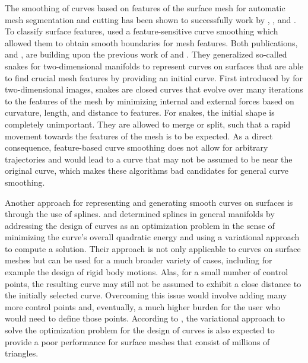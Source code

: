 \documentclass{stdlocal}
\begin{document}
The smoothing of curves based on features of the surface mesh for automatic mesh segmentation and cutting has been shown to successfully work by \textcite{jung2004}, \textcite{bischoff2005}, and \textcite{lai2007}.
To classify surface features, \textcite{lai2007} used a feature-sensitive curve smoothing which allowed them to obtain smooth boundaries for mesh features.
Both publications, \textcite{jung2004} and \textcite{bischoff2005}, are building upon the previous work of \textcite{lee2002} and \textcite{lee2004}.
They generalized so-called snakes for two-dimensional manifolds to represent curves on surfaces that are able to find crucial mesh features by providing an initial curve.
First introduced by \textcite{kass1988} for two-dimensional images, snakes are closed curves that evolve over many iterations to the features of the mesh by minimizing internal and external forces based on curvature, length, and distance to features.
For snakes, the initial shape is completely unimportant.
They are allowed to merge or split, such that a rapid movement towards the features of the mesh is to be expected.
As a direct consequence, feature-based curve smoothing does not allow for arbitrary trajectories and would lead to a curve that may not be assumed to be near the original curve, which makes these algorithms bad candidates for general curve smoothing.

Another approach for representing and generating smooth curves on surfaces is through the use of splines.
\textcite{hofer2004} and \textcite{pottmann2005} determined splines in general manifolds by addressing the design of curves as an optimization problem in the sense of minimizing the curve's overall quadratic energy and using a variational approach to compute a solution.
Their approach is not only applicable to curves on surface meshes but can be used for a much broader variety of cases, including for example the design of rigid body motions.
Alas, for a small number of control points, the resulting curve may still not be assumed to exhibit a close distance to the initially selected curve.
Overcoming this issue would involve adding many more control points and, eventually, a much higher burden for the user who would need to define those points.
According to \textcite{mancinelli2022}, the variational approach to solve the optimization problem for the design of curves is also expected to provide a poor performance for surface meshes that consist of millions of triangles.
\end{document}
